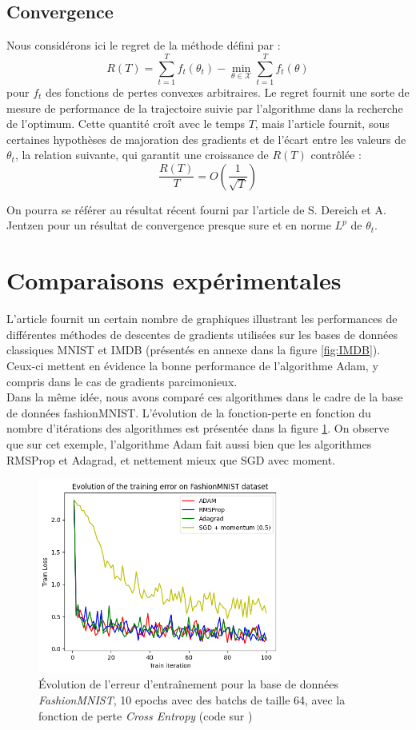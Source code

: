 \documentclass[11pt,a4paper, french]{article}
\newcommand{\dsum}[2]{\displaystyle\sum_{#1}^{#2}}
\theoremstyle{definition}
\begin{document}
\subsection{Convergence}

Nous considérons ici le regret de la méthode défini par : 
$$R(T)=\dsum{t=1}Tf_t(\theta_t)-\min_{\theta\in\mathcal X}\dsum{t=1}Tf_t(\theta)$$
pour $f_t$ des fonctions de pertes convexes arbitraires. Le regret fournit une sorte de mesure de performance de la trajectoire suivie par l'algorithme dans la recherche de l'optimum. Cette quantité croît avec le temps $T$, mais l'article fournit, sous certaines hypothèses de majoration des gradients et de l'écart entre les valeurs de $\theta_t$,  la relation suivante, qui garantit une croissance de $R(T)$ contrôlée :
$$\dfrac{R(T)}{T}=O\left(\dfrac 1{\sqrt T}\right)$$

On pourra se référer au résultat récent fourni par l'article de S. Dereich et A. Jentzen \cite{dereich2024convergenceratesadamoptimizer} pour un résultat de convergence presque sure et en norme $L^p$ de $\theta_t$. 

\section{Comparaisons expérimentales}
L'article fournit un certain nombre de graphiques illustrant les performances de différentes méthodes de descentes de gradients utilisées sur les bases de données classiques MNIST et IMDB (présentés en annexe dans la figure \ref{fig:IMDB}). Ceux-ci mettent en évidence la bonne performance de l'algorithme Adam, y compris dans le cas de gradients parcimonieux. \\
Dans la même idée, nous avons comparé ces algorithmes dans le cadre de la base de données fashionMNIST. L'évolution de la fonction-perte en fonction du nombre d'itérations des algorithmes est présentée dans la figure \ref{fig1}. On observe que sur cet exemple, l'algorithme Adam fait aussi bien que les algorithmes RMSProp et Adagrad, et nettement mieux que SGD avec moment. 



\begin{figure}[H]
\centering
 \includegraphics[width=8cm]{Images/FashionMNIST.png}
\caption{Évolution de l'erreur d'entraînement pour la base de données \textit{FashionMNIST}, 10 epochs avec des batchs de taille 64, avec la fonction de perte \textit{Cross Entropy} (code sur \cite{github})}
\label{fig1}
\end{figure}
\end{document}
